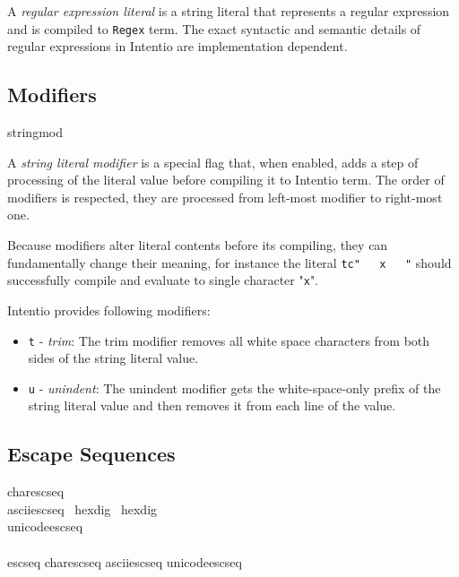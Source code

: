A \emph{regular expression literal} is a string literal that represents a regular expression and is compiled to \lstinline{Regex} term. The exact syntactic and semantic details of regular expressions in Intentio are implementation dependent.

\subsection*{Modifiers}

\begin{bnf}
  stringmod \eq {} \gor {}
\end{bnf}

A \emph{string literal modifier} is a special flag that, when enabled, adds a step of processing of the literal value before compiling it to Intentio term. The order of modifiers is respected, they are processed from left-most modifier to right-most one.

Because modifiers alter literal contents before its compiling, they can fundamentally change their meaning, for instance the literal \lstinline{tc"   x   "} should successfully compile and evaluate to single character "\texttt{x}".

Intentio provides following modifiers:

\begin{itemize}
  \item \texttt{t} - \emph{trim}: The trim modifier removes all white space characters from both sides of the string literal value.
  \item \texttt{u} - \emph{unindent}: The unindent modifier gets the white-space-only prefix of the string literal value and then removes it from each line of the value.
\end{itemize}

\subsection*{Escape Sequences}

\begin{bnf}
  charescseq \eq {} \gor {} \gor {} \gor {} \gor {} \gor \term{\textbackslash \textbackslash} \gor {} \\
  asciiescseq \eq {} \ hexdig \ hexdig \\
  unicodeescseq \eq {} \  \ \term{\}} \\
  \\
  escseq \eq charescseq \gor asciiescseq \gor unicodeescseq
\end{bnf}

